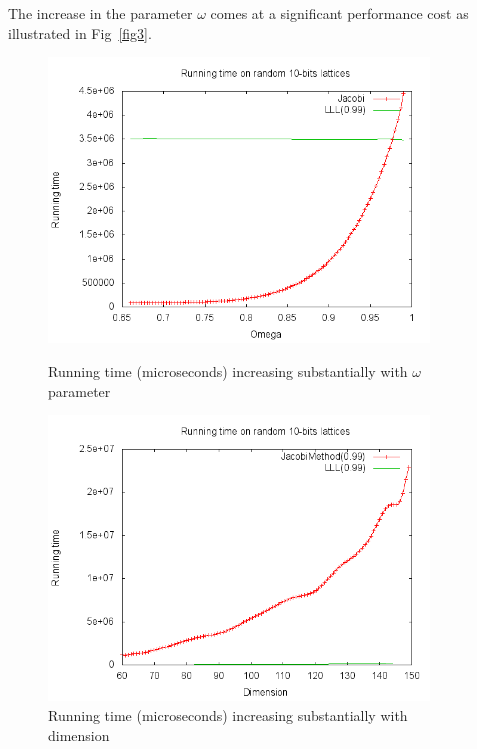 \documentclass[10pt, a4paper]{article}
\begin{document}
The increase in the parameter $\omega$ comes at a significant performance cost as illustrated in Fig~\ref{fig3}.

\begin{figure}[H]
\begin{minipage}{.45\textwidth}
\includegraphics[width=0.9\textwidth]{results-graphs/runningtime.png}

\caption{Running time (microseconds) increasing substantially with $\omega$ parameter}
\label{fig3}
\end{minipage}
\hspace{.05\textwidth}
\begin{minipage}{.45\textwidth}
    \includegraphics[width=0.9\textwidth]{results-graphs/runningtime-dimension.png}    
  \caption{Running time (microseconds) increasing substantially with dimension}
  \label{fig6}
\end{minipage}

\end{figure}
\end{document}

